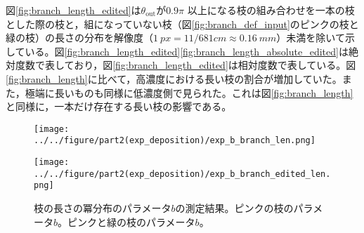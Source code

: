 \documentclass[autodetect-engine,dvi=dvipdfmx,a4paper,ja=standard,oneside,openany,11pt,draft]{bxjsbook}
\begin{document}
図\ref{fig:branch_length_edited}は$\theta_{\mathrm{out}}$が$0.9\pi$ 以上になる枝の組み合わせを一本の枝とした際の枝と，組になっていない枝（図\ref{fig:branch_def_input}のピンクの枝と緑の枝）の長さの分布を解像度（$\SI{1}{px}=11/681 \si{cm}\approx \SI{0.16}{mm}$）未満を除いて示している。図\ref{fig:branch_length_edited}\ref{fig:branch_length_absolute_edited}は絶対度数で表しており，図\ref{fig:branch_length_edited}は相対度数で表している。図\ref{fig:branch_length}に比べて，高濃度における長い枝の割合が増加していた。また，極端に長いものも同様に低濃度側で見られた。これは図\ref{fig:branch_length}と同様に，一本だけ存在する長い枝の影響である。
\begin{figure}[htbp]
  \begin{minipage}
    {0.55\textwidth}
    \subcaption{}
    \centering
    \texttt{[image: ../../figure/part2(exp\_deposition)/exp\_b\_branch\_len.png]}
    \label{fig:exp_b_branch_len}
  \end{minipage}
  \begin{minipage}
    {0.43\textwidth}
    \subcaption{}
    \centering
    \texttt{[image: ../../figure/part2(exp\_deposition)/exp\_b\_branch\_edited\_len.png]}
    \label{fig:exp_b_branch_edited_len}
  \end{minipage}
  \caption{枝の長さの冪分布のパラメータ$b$の測定結果。ピンクの枝のパラメータ$b$。ピンクと緑の枝のパラメータ$b$。}
  \label{fig:branch_length_exp}
\end{figure}
\end{document}
